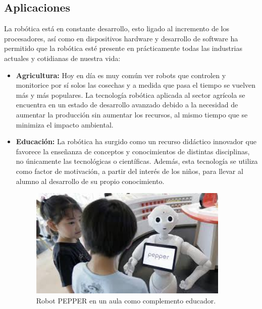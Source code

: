 \subsection{Aplicaciones}
\hspace{1cm} La robótica está en constante desarrollo, esto ligado al incremento de los procesadores, así como en dispositivos hardware y desarrollo de software ha permitido que la robótica esté presente en prácticamente todas las industrias actuales y cotidianas de nuestra vida:
\begin{itemize}
		\item \textbf{Agricultura: }Hoy en día es muy común ver robots que controlen y monitorice por sí solos las cosechas y a medida que pasa el tiempo se vuelven más y más populares. La tecnología robótica aplicada al sector agrícola se encuentra en un estado de desarrollo avanzado debido a la necesidad de aumentar la producción sin aumentar los recursos, al mismo tiempo que se minimiza el impacto ambiental.
		\item \textbf{Educación: }La robótica ha surgido como un recurso didáctico innovador que favorece la enseñanza de conceptos y conocimientos de distintas disciplinas, no únicamente las tecnológicas o científicas.  Además, esta tecnología  se utiliza como factor de motivación, a partir del interés de los niños, para llevar al alumno al desarrollo de su propio conocimiento.
\\
		\begin{figure}[H]
			\begin{center}
				\includegraphics[width=0.9\textwidth]{imag/IMG12.jpeg}
					\caption{Robot PEPPER en un aula como complemento educador.}
			\label{fig:Robot PEPPER.}	
			\end{center}
		\end{figure}


\end{itemize}
